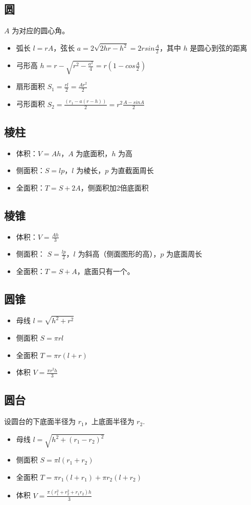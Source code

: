 \subsection{圆}
\noindent $A$ 为对应的圆心角。
\begin{itemize}
    \item 弧长 $l=rA$，弦长 $a = 2 \sqrt{2hr - h^2} = 2rsin\frac{A}{2}$，其中 $h$ 是圆心到弦的距离
    \item 弓形高 $h = r - \sqrt{r^2-\frac{a^2}{4}}=r(1-cos\frac{A}{2})$
    \item 扇形面积 $S_1 = \frac{rl}{2} = \frac{Ar^2}{2}$
    \item 弓形面积 $S_2 = \frac{(r_1 - a(r-h))}{2} = r^2\frac{A-sinA}{2}$
\end{itemize}

\subsection{棱柱}
\begin{itemize}
    \item 体积：$V=Ah$，$A$ 为底面积，$h$ 为高
    \item 侧面积：$S=lp$，$l$ 为棱长，$p$ 为直截面周长
    \item 全面积：$T=S+2A$，侧面积加2倍底面积
\end{itemize}

\subsection{棱锥}
\begin{itemize}
    \item 体积：$V=\frac{Ah}{3}$
    \item 侧面积： $S=\frac{lp}{2}$，$l$ 为斜高（侧面图形的高），$p$ 为底面周长
    \item 全面积：$T=S+A$，底面只有一个。
\end{itemize}

\subsection{圆锥}
\begin{itemize}
    \item 母线 $l=\sqrt{h^2+r^2}$
    \item 侧面积 $S=\pi rl$
    \item 全面积 $T=\pi r(l+r)$
    \item 体积 $V= \frac{\pi r^2h}{3}$
\end{itemize}

\subsection{圆台}
\noindent 设圆台的下底面半径为 $r_1$，上底面半径为 $r_2$.
\begin{itemize}
    \item 母线 $l=\sqrt{h^2+(r_1-r_2)^2}$
    \item 侧面积 $S = \pi l (r_1+r_2)$
    \item 全面积 $T = \pi r_1(l + r_1) + \pi r_2(l + r_2)$
    \item 体积 $V = \frac{\pi(r_1^2+r_2^2+r_1r_2)h}{3}$
\end{itemize}
